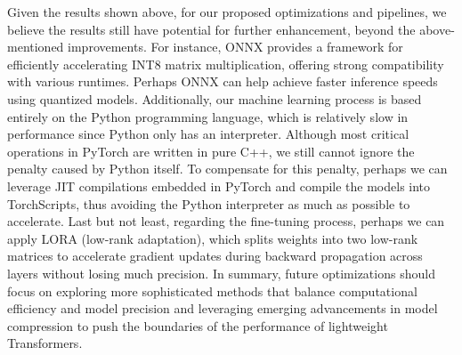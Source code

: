 Given the results shown above, for our proposed optimizations and pipelines, we believe the results still have potential for further enhancement, beyond the above-mentioned improvements.
For instance, ONNX provides a framework for efficiently accelerating INT8 matrix multiplication, offering strong compatibility with various runtimes. Perhaps ONNX can help achieve faster inference speeds using quantized models.
Additionally, our machine learning process is based entirely on the Python programming language, which is relatively slow in performance since Python only has an interpreter. Although most critical operations in PyTorch are written in pure C++, we still cannot ignore the penalty caused by Python itself. To compensate for this penalty, perhaps we can leverage JIT compilations embedded in PyTorch and compile the models into TorchScripts, thus avoiding the Python interpreter as much as possible to accelerate.
Last but not least, regarding the fine-tuning process, perhaps we can apply LORA (low-rank adaptation), which splits weights into two low-rank matrices to accelerate gradient updates during backward propagation across layers without losing much precision.
In summary, future optimizations should focus on exploring more sophisticated methods that balance computational efficiency and model precision and leveraging emerging advancements in model compression to push the boundaries of the performance of lightweight Transformers.
